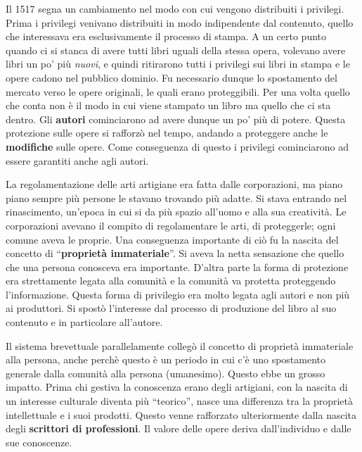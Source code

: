Il 1517 segna un cambiamento nel modo con cui vengono distribuiti i privilegi. Prima i privilegi venivano distribuiti in modo indipendente dal contenuto, quello che interessava era esclusivamente il processo di stampa. A un certo punto quando ci si stanca di avere tutti libri uguali della stessa opera, volevano avere libri un po' più \textit{nuovi}, e quindi ritirarono tutti i privilegi sui libri in stampa e le opere cadono nel pubblico dominio. Fu necessario dunque lo spostamento del mercato verso le opere originali, le quali erano proteggibili. Per una volta quello che conta non è il modo in cui viene stampato un libro ma quello che ci sta dentro. Gli \textbf{autori} cominciarono ad avere dunque un po' più di potere. Questa protezione sulle opere si rafforzò nel tempo, andando a proteggere anche le \textbf{modifiche} sulle opere. Come conseguenza di questo i privilegi cominciarono ad essere garantiti anche agli autori.  

La regolamentazione delle arti artigiane era fatta dalle corporazioni, ma piano piano sempre più persone le stavano trovando più adatte. Si stava entrando nel rinascimento, un'epoca in cui si da più spazio all'uomo e alla sua creatività. Le corporazioni avevano il compito di regolamentare le arti, di proteggerle; ogni comune aveva le proprie. Una conseguenza importante di ciò fu la nascita del concetto di ``\textbf{proprietà immateriale}''. Si aveva la netta sensazione che quello che una persona conosceva era importante. D'altra parte la forma di protezione era strettamente legata alla comunità e la comunità va protetta proteggendo l'informazione. Questa forma di privilegio era molto legata agli autori e non più ai produttori. Si spostò l'interesse dal processo di produzione del libro al suo contenuto e in particolare all'autore.

Il sistema brevettuale parallelamente collegò il concetto di proprietà immateriale alla persona, anche perchè questo è un periodo in cui c'è uno spostamento generale dalla comunità alla persona (umanesimo). Questo ebbe un grosso impatto. Prima chi gestiva la conoscenza erano degli artigiani, con la nascita di un interesse culturale diventa più ``teorico'', nasce una differenza tra la proprietà intellettuale e i suoi prodotti. Questo venne rafforzato ulteriormente dalla nascita degli \textbf{scrittori di professioni}. Il valore delle opere deriva dall'individuo e dalle sue conoscenze.

